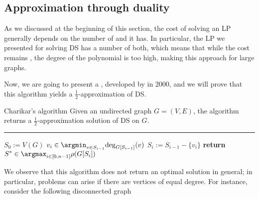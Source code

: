 \documentclass[a4paper, 12pt]{report}
\begin{document}
    \subsection{Approximation through duality}

    As we discussed at the beginning of this section, the cost of solving an LP generally depends on the number of  and  it has. In particular, the LP we presented for solving DS has a  number of both, which means that while the cost remains , the degree of the polynomial is too high, making this approach  for large graphs.

    Now, we are going to present a , developed by \textcite{charikar} in 2000, and we will prove that this algorithm yields a $\tfrac{1}{2}$-approximation of DS.

    \begin{framedalgo}[label={charikar's algo}]{Charikar's algorithm}
        Given an undirected graph $G = (V, E)$, the algorithm returns a $\tfrac{1}{2}$-approximation solution of DS on $G$. \\
        \hrule

        \quad
        \begin{algorithmic}[1]
                \State $S_0 := V(G)$
                    \State $\displaystyle v_i \in \argmin_{v \in S_{i - 1}}{\deg_{G[S_{i - 1}]}(v)}$
                    \State $S_i := S_{i - 1} - \{v_i\}$
                \EndFor
                \State \textbf{return} $\displaystyle S^* \in \argmax_{i \in [0, n - 1]}{\rho(G[S_i])}$
            \EndFunction
        \end{algorithmic}
    \end{framedalgo}


    We observe that this algorithm does not return an optimal solution in general; in particular, problems can arise if there are vertices of equal degree. For instance, consider the following disconnected graph
\end{document}
